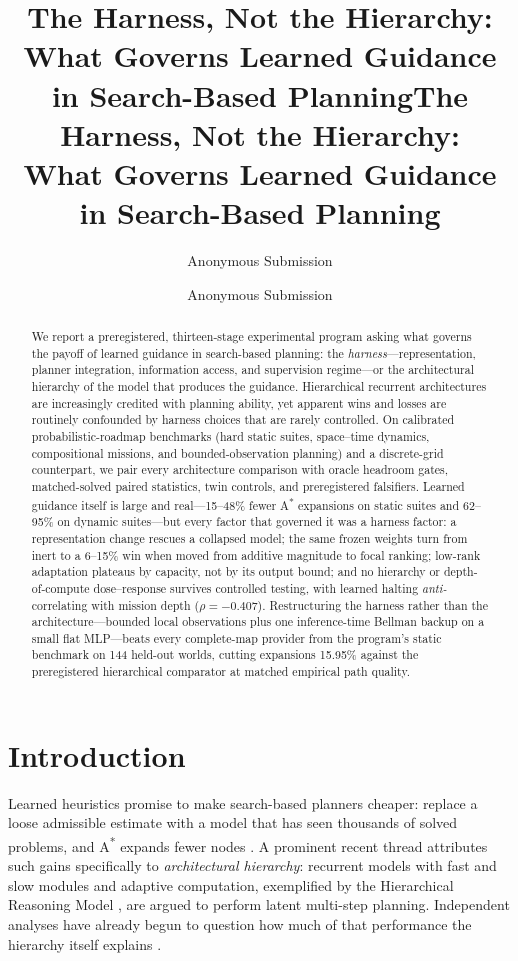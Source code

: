 \documentclass[letterpaper]{article} %
\title{The Harness, Not the Hierarchy:\\What Governs Learned Guidance in Search-Based Planning}
\author{Anonymous Submission}
\title{The Harness, Not the Hierarchy:\\What Governs Learned Guidance in Search-Based Planning}
\author{Anonymous Submission}
\begin{document}
\maketitle

\begin{abstract}
We report a preregistered, thirteen-stage experimental program asking what governs the payoff of learned guidance in search-based planning: the \emph{harness}---representation, planner integration, information access, and supervision regime---or the architectural hierarchy of the model that produces the guidance. Hierarchical recurrent architectures are increasingly credited with planning ability, yet apparent wins and losses are routinely confounded by harness choices that are rarely controlled. On calibrated probabilistic-roadmap benchmarks (hard static suites, space--time dynamics, compositional missions, and bounded-observation planning) and a discrete-grid counterpart, we pair every architecture comparison with oracle headroom gates, matched-solved paired statistics, twin controls, and preregistered falsifiers. Learned guidance itself is large and real---15--48\% fewer A\textsuperscript{*} expansions on static suites and 62--95\% on dynamic suites---but every factor that governed it was a harness factor: a representation change rescues a collapsed model; the same frozen weights turn from inert to a 6--15\% win when moved from additive magnitude to focal ranking; low-rank adaptation plateaus by capacity, not by its output bound; and no hierarchy or depth-of-compute dose--response survives controlled testing, with learned halting \emph{anti-}correlating with mission depth ($\rho{=}-0.407$). Restructuring the harness rather than the architecture---bounded local observations plus one inference-time Bellman backup on a small flat MLP---beats every complete-map provider from the program's static benchmark on 144 held-out worlds, cutting expansions 15.95\% against the preregistered hierarchical comparator at matched empirical path quality.
\end{abstract}

\section{Introduction}

Learned heuristics promise to make search-based planners cheaper: replace a loose admissible estimate with a model that has seen thousands of solved problems, and A\textsuperscript{*} expands fewer nodes \citep{arfaee2011bootstrap,bhardwaj2017sail,yonetani2021neuralastar}. A prominent recent thread attributes such gains specifically to \emph{architectural hierarchy}: recurrent models with fast and slow modules and adaptive computation, exemplified by the Hierarchical Reasoning Model \citep[HRM;][]{wang2025hrm}, are argued to perform latent multi-step planning. Independent analyses have already begun to question how much of that performance the hierarchy itself explains \citep{jolicoeur2025trm}.
\end{document}

